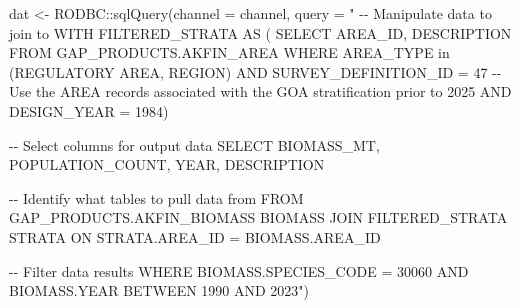 \documentclass[
  letterpaper,
  oneside,
  open=any]{scrbook}
\newenvironment{Shaded}{\begin{snugshade}}{\end{snugshade}}
\newcommand{\AttributeTok}[1]{\textcolor[rgb]{0.40,0.45,0.13}{#1}}
\newcommand{\FunctionTok}[1]{\textcolor[rgb]{0.28,0.35,0.67}{#1}}
\newcommand{\NormalTok}[1]{\textcolor[rgb]{0.00,0.23,0.31}{#1}}
\newcommand{\OtherTok}[1]{\textcolor[rgb]{0.00,0.23,0.31}{#1}}
\newcommand{\SpecialCharTok}[1]{\textcolor[rgb]{0.37,0.37,0.37}{#1}}
\newcommand{\StringTok}[1]{\textcolor[rgb]{0.13,0.47,0.30}{#1}}
\begin{document}
\begin{Shaded}
\begin{Highlighting}[]
\NormalTok{dat }\OtherTok{\textless{}{-}}\NormalTok{ RODBC}\SpecialCharTok{::}\FunctionTok{sqlQuery}\NormalTok{(}\AttributeTok{channel =}\NormalTok{ channel, }
                       \AttributeTok{query =} 
                         \StringTok{"}
\StringTok{{-}{-} Manipulate data to join to}
\StringTok{WITH FILTERED\_STRATA AS (}
\StringTok{SELECT AREA\_ID, DESCRIPTION FROM GAP\_PRODUCTS.AKFIN\_AREA}
\StringTok{WHERE AREA\_TYPE in (\textquotesingle{}REGULATORY AREA\textquotesingle{}, \textquotesingle{}REGION\textquotesingle{}) }
\StringTok{AND SURVEY\_DEFINITION\_ID = 47}
\StringTok{{-}{-} Use the AREA records associated with the GOA stratification prior to 2025}
\StringTok{AND DESIGN\_YEAR = 1984)}

\StringTok{{-}{-} Select columns for output data}
\StringTok{SELECT }
\StringTok{BIOMASS\_MT,}
\StringTok{POPULATION\_COUNT, }
\StringTok{YEAR, }
\StringTok{DESCRIPTION}

\StringTok{{-}{-} Identify what tables to pull data from}
\StringTok{FROM GAP\_PRODUCTS.AKFIN\_BIOMASS BIOMASS}
\StringTok{JOIN FILTERED\_STRATA STRATA }
\StringTok{ON STRATA.AREA\_ID = BIOMASS.AREA\_ID}

\StringTok{{-}{-} Filter data results}
\StringTok{WHERE BIOMASS.SPECIES\_CODE = 30060}
\StringTok{AND BIOMASS.YEAR BETWEEN 1990 AND 2023"}\NormalTok{)}
\end{Highlighting}
\end{Shaded}
\end{document}
